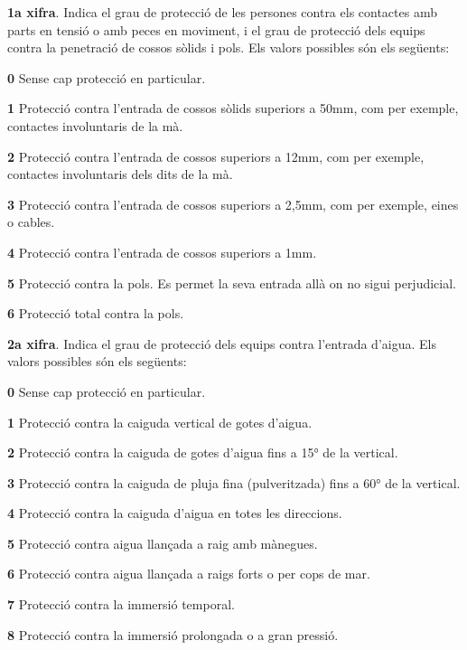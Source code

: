 \textbf{1a xifra}. Indica el grau de protecci\'{o} de les persones contra els contactes amb
parts en tensi\'{o} o amb peces en moviment, i el grau de protecci\'{o} dels equips contra la
penetraci\'{o} de cossos s\`{o}lids i pols. Els valors possibles s\'{o}n els seg\"{u}ents:
\begin{list}{}
   {\setlength{\labelwidth}{10mm} \setlength{\leftmargin}{10mm} \setlength{\labelsep}{2mm}}
   \item[\textbf{0}] Sense cap protecci\'{o} en particular.
   \item[\textbf{1}] Protecci\'{o} contra l'entrada de cossos s\`{o}lids superiors a 50\unit{mm},
   com per exemple,   contactes involuntaris de la m\`{a}.
   \item[\textbf{2}] Protecci\'{o} contra l'entrada de cossos superiors a 12\unit{mm}, com per exemple,
   contactes involuntaris dels dits de la m\`{a}.
   \item[\textbf{3}] Protecci\'{o} contra l'entrada de cossos superiors a 2,5\unit{mm},
   com per exemple, eines o cables.
   \item[\textbf{4}] Protecci\'{o} contra l'entrada de cossos superiors a 1\unit{mm}.
   \item[\textbf{5}] Protecci\'{o} contra la pols. Es permet la seva entrada all\`{a} on no sigui perjudicial.
   \item[\textbf{6}] Protecci\'{o} total contra la pols.
\end{list}

\textbf{2a xifra}. Indica el grau de protecci\'{o} dels equips contra
l'entrada d'aigua. Els valors possibles s\'{o}n els seg\"{u}ents:
\begin{list}{}
   {\setlength{\labelwidth}{10mm} \setlength{\leftmargin}{10mm} \setlength{\labelsep}{2mm}}
   \item[\textbf{0}] Sense cap protecci\'{o} en particular.
   \item[\textbf{1}] Protecci\'{o} contra la caiguda vertical de gotes d'aigua.
   \item[\textbf{2}] Protecci\'{o} contra la caiguda de gotes d'aigua fins a 15\unit{\degree} de la  vertical.
   \item[\textbf{3}] Protecci\'{o} contra la caiguda de pluja fina (pulveritzada) fins a 60\unit{\degree} de la  vertical.
   \item[\textbf{4}] Protecci\'{o} contra la caiguda d'aigua en totes les direccions.
   \item[\textbf{5}] Protecci\'{o} contra aigua llan\c{c}ada a raig amb m\`{a}negues.
   \item[\textbf{6}] Protecci\'{o} contra aigua llan\c{c}ada a raigs forts o per cops de mar.
   \item[\textbf{7}] Protecci\'{o} contra la immersi\'{o} temporal.
   \item[\textbf{8}] Protecci\'{o} contra la immersi\'{o} prolongada o a gran pressi\'{o}.
\end{list}


